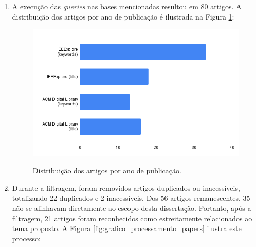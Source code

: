 \begin{enumerate}
    \item A execução das \textit{queries} nas bases mencionadas resultou em 80 artigos. A distribuição dos artigos por ano de publicação é ilustrada na Figura \ref{fig:grafico_num_papers}:
      \begin{figure}[H]
    \centering
    \caption{Distribuição dos artigos por ano de publicação.} \includegraphics[width=13cm,height=\textwidth,keepaspectratio]{2-images/artigos-bars-horizontal.png}
    \newline {}\label{fig:grafico_num_papers}
    \end{figure}
    
   \item Durante a filtragem, foram removidos artigos duplicados ou inacessíveis, totalizando 22 duplicados e 2 inacessíveis. Dos 56 artigos remanescentes, 35 não se alinhavam diretamente ao escopo desta dissertação. Portanto, após a filtragem, 21 artigos foram reconhecidos como estreitamente relacionados ao tema proposto. A Figura \ref{fig:grafico_processamento_papers} ilustra este processo:


\end{enumerate}
